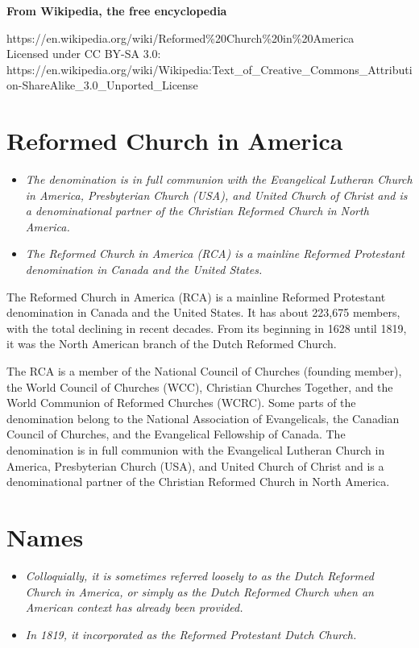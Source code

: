 \textbf{From Wikipedia, the free encyclopedia}

https://en.wikipedia.org/wiki/Reformed\%20Church\%20in\%20America\\
Licensed under CC BY-SA 3.0:\\
https://en.wikipedia.org/wiki/Wikipedia:Text\_of\_Creative\_Commons\_Attribution-ShareAlike\_3.0\_Unported\_License

\section{Reformed Church in America}\label{reformed-church-in-america}

\begin{itemize}
\item
  \emph{The denomination is in full communion with the Evangelical
  Lutheran Church in America, Presbyterian Church (USA), and United
  Church of Christ and is a denominational partner of the Christian
  Reformed Church in North America.}
\item
  \emph{The Reformed Church in America (RCA) is a mainline Reformed
  Protestant denomination in Canada and the United States.}
\end{itemize}

The Reformed Church in America (RCA) is a mainline Reformed Protestant
denomination in Canada and the United States. It has about 223,675
members, with the total declining in recent decades. From its beginning
in 1628 until 1819, it was the North American branch of the Dutch
Reformed Church.

The RCA is a member of the National Council of Churches (founding
member), the World Council of Churches (WCC), Christian Churches
Together, and the World Communion of Reformed Churches (WCRC). Some
parts of the denomination belong to the National Association of
Evangelicals, the Canadian Council of Churches, and the Evangelical
Fellowship of Canada. The denomination is in full communion with the
Evangelical Lutheran Church in America, Presbyterian Church (USA), and
United Church of Christ and is a denominational partner of the Christian
Reformed Church in North America.

\section{Names}\label{names}

\begin{itemize}
\item
  \emph{Colloquially, it is sometimes referred loosely to as the Dutch
  Reformed Church in America, or simply as the Dutch Reformed Church
  when an American context has already been provided.}
\item
  \emph{In 1819, it incorporated as the Reformed Protestant Dutch
  Church.}
\end{itemize}

